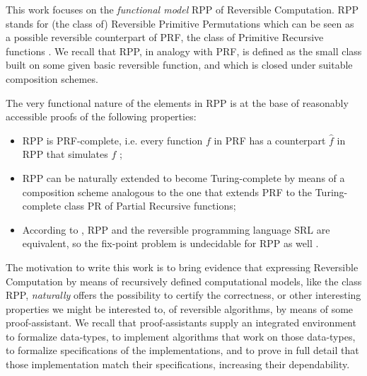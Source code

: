 \documentclass[runningheads]{llncs}
\newcommand{\RPP}{\textsf{RPP}\xspace}
\newcommand{\PRF}{\textsf{PRF}\xspace}
\newcommand{\PR}{\textsf{PR}\xspace}
\newcommand{\SRL}{\textsf{SRL}\xspace}
\begin{document}
This work focuses on the \emph{functional model} \RPP \cite{DBLP:journals/tcs/PaoliniPR20} of Reversible Computation.
\RPP stands for (the class of) Reversible Primitive Permutations which can be seen as a possible reversible counterpart of \PRF, the class of Primitive Recursive functions \cite{rogers1967theory}.
We recall that \RPP, in analogy with \PRF, is defined as the small class built on some given basic reversible function,
and which is closed under suitable composition schemes.

The very functional nature of the elements in \RPP is at the base of reasonably accessible proofs of the following properties:
\begin{itemize}
\item \RPP is \PRF-complete, i.e. every function $ f $ in \PRF has a counterpart $ \hat{f} $ in \RPP that simulates $ f $ \cite{DBLP:journals/tcs/PaoliniPR20};

\item \RPP can be naturally extended to become Turing-complete \cite{Paolini2018NGC} by means of a composition scheme analogous to the one that extends \PRF to the Turing-complete class \PR of Partial Recursive functions;

\item According to \cite{MatosRC2020}, \RPP and the reversible programming language \SRL \cite{matos03tcs} are equivalent, so the fix-point problem is undecidable for \RPP as well \cite{2318_1734164MatosPaoliniRoversiTCSICTCS18}.
\end{itemize}

The motivation to write this work is to bring evidence that expressing Reversible Computation by means of recursively defined computational models, like the class \RPP, \emph{naturally} offers the possibility to certify the correctness, or other interesting properties we might be interested to, of reversible algorithms, by means of some proof-assistant.
We recall that proof-assistants supply an integrated environment to formalize data-types, to implement algorithms that work on those data-types, to formalize specifications of the implementations, and to prove in full detail that those implementation match their specifications, increasing their dependability.

\end{document}
